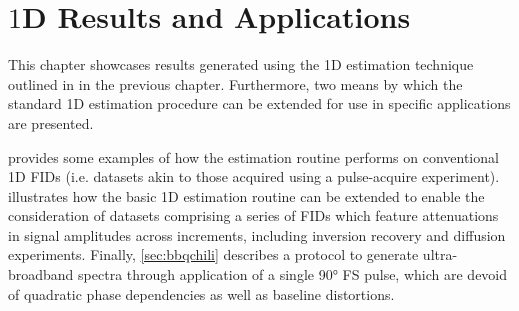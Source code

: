 \chapter{$1$D Results and Applications}
\label{chap:results}

This chapter showcases results generated using the \ac{1D} estimation
technique outlined in in the previous chapter. Furthermore, two means by
which the standard \ac{1D} estimation procedure can be extended for use in
specific applications are presented.

 provides some examples of how the estimation
routine performs on conventional \ac{1D} \acp{FID} (i.e. datasets akin to those
acquired using a pulse-acquire experiment).  illustrates
how the basic \ac{1D} estimation routine can be extended to enable the
consideration of datasets comprising a series of \acp{FID} which
feature attenuations in signal amplitudes across increments, including inversion
recovery and diffusion experiments. Finally, \cref{sec:bbqchili}
describes a protocol to generate ultra-broadband spectra through application of
a single \ang{90} \acl{FS} pulse, which are devoid of quadratic phase
dependencies as well as baseline distortions.





